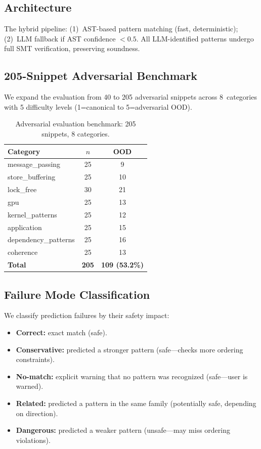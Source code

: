 \documentclass[11pt]{article}
\begin{document}
\subsection{Architecture}

The hybrid pipeline: (1)~AST-based pattern matching (fast,
deterministic); (2)~LLM fallback if AST confidence $<0.5$.
All LLM-identified patterns undergo full SMT verification,
preserving soundness.

\subsection{205-Snippet Adversarial Benchmark}

We expand the evaluation from 40 to 205 adversarial snippets
across 8~categories with 5 difficulty levels (1=canonical to
5=adversarial OOD).

\begin{table}[ht]
\centering
\caption{Adversarial evaluation benchmark: 205 snippets, 8 categories.}
\label{tab:benchmark}
\small
\begin{tabular}{lcc}
\toprule
\textbf{Category} & \textbf{$n$} & \textbf{OOD} \\
\midrule
message\_passing & 25 & 9 \\
store\_buffering & 25 & 10 \\
lock\_free & 30 & 21 \\
gpu & 25 & 13 \\
kernel\_patterns & 25 & 12 \\
application & 25 & 15 \\
dependency\_patterns & 25 & 16 \\
coherence & 25 & 13 \\
\midrule
\textbf{Total} & \textbf{205} & \textbf{109 (53.2\%)} \\
\bottomrule
\end{tabular}
\end{table}

\subsection{Failure Mode Classification}

We classify prediction failures by their safety impact:
\begin{itemize}[nosep]
\item \textbf{Correct:} exact match (safe).
\item \textbf{Conservative:} predicted a stronger pattern
  (safe---checks more ordering constraints).
\item \textbf{No-match:} explicit warning that no pattern was
  recognized (safe---user is warned).
\item \textbf{Related:} predicted a pattern in the same family
  (potentially safe, depending on direction).
\item \textbf{Dangerous:} predicted a weaker pattern
  (unsafe---may miss ordering violations).
\end{itemize}
\end{document}
